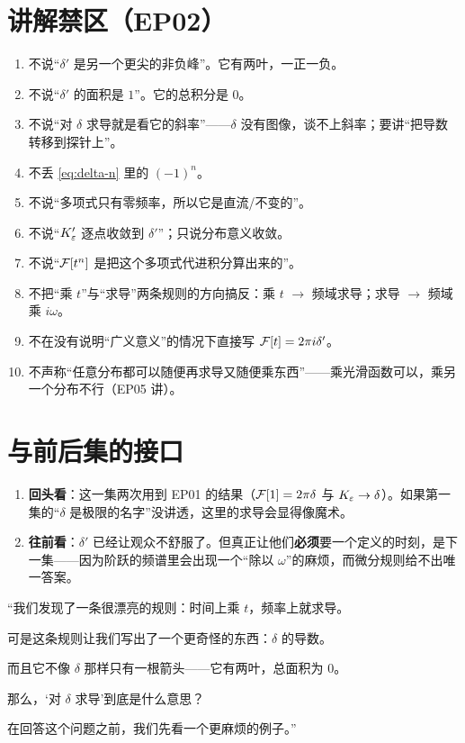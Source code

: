 \section{讲解禁区（EP02）}

\begin{warnbox}[逐条对照]
\begin{enumerate}[leftmargin=1.6em,itemsep=0.28em]
\item 不说“$\delta'$ 是另一个更尖的非负峰”。它有两叶，一正一负。
\item 不说“$\delta'$ 的面积是 $1$”。它的总积分是 $0$。
\item 不说“对 $\delta$ 求导就是看它的斜率”——$\delta$ 没有图像，谈不上斜率；要讲“把导数转移到探针上”。
\item 不丢 \eqref{eq:delta-n} 里的 $(-1)^{n}$。
\item 不说“多项式只有零频率，所以它是直流/不变的”。
\item 不说“$K_\varepsilon'$ 逐点收敛到 $\delta'$”；只说分布意义收敛。
\item 不说“$\mathcal{F}[t^{n}]$ 是把这个多项式代进积分算出来的”。
\item 不把“乘 $t$”与“求导”两条规则的方向搞反：乘 $t$ $\to$ 频域求导；求导 $\to$ 频域乘 $i\omega$。
\item 不在没有说明“广义意义”的情况下直接写 $\mathcal{F}[t]=2\pi i\delta'$。
\item 不声称“任意分布都可以随便再求导又随便乘东西”——乘光滑函数可以，乘另一个分布不行（EP05 讲）。
\end{enumerate}
\end{warnbox}

\section{与前后集的接口}

\begin{enumerate}[leftmargin=2em,itemsep=0.45em]
\item \textbf{回头看}：这一集两次用到 EP01 的结果（$\mathcal{F}[1]=2\pi\delta$ 与 $K_\varepsilon\to\delta$）。如果第一集的“$\delta$ 是极限的名字”没讲透，这里的求导会显得像魔术。
\item \textbf{往前看}：$\delta'$ 已经让观众不舒服了。但真正让他们\textbf{必须}要一个定义的时刻，是下一集——因为阶跃的频谱里会出现一个“除以 $\omega$”的麻烦，而微分规则给不出唯一答案。
\end{enumerate}

\begin{scriptbox}[最后 30 秒的旁白骨架]
“我们发现了一条很漂亮的规则：时间上乘 $t$，频率上就求导。

可是这条规则让我们写出了一个更奇怪的东西：$\delta$ 的导数。

而且它不像 $\delta$ 那样只有一根箭头——它有两叶，总面积为 $0$。

那么，‘对 $\delta$ 求导’到底是什么意思？

在回答这个问题之前，我们先看一个更麻烦的例子。”
\end{scriptbox}


